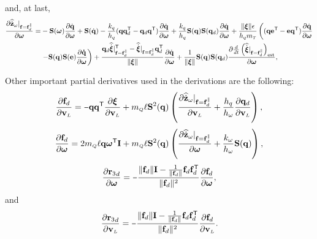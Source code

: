 \documentclass[journal,onecolumn]{IEEEtran}
\newcommand{\minus}{\scalebox{0.75}[1.0]{$-$}}
\begin{document}
	and, at last,
    \begin{align}
        \frac{\partial\zwdothat|_{\f=\fd^{\|}}}{\partial\wL}=&-\Skew{\wL}\frac{\partial\dirdot}{\partial\wL}+\Skew{\dirdot}-\frac{k_q}{h_q}(\dir\dird[T]-\dird\dir[T])\frac{\partial\dirdot}{\partial\wL}
        +\frac{k_q}{h_q}\Skew{\dir}\Skew{\dird}\frac{\partial\dirdot}{\partial\wL} + \frac{\|\Xiq\|\epsilon}{h_{q}\mT}\left((\dir{\bf e}\trs-{\bf e}\dir[T])\frac{\partial\dirdot}{\partial\wL}\right. \nonumber\\
        &\left.-\Skew{\dir}\Skew{\bf e}\frac{\partial\dirdot}{\partial\wL}\right)+\frac{\dird\widehat{\dot{\Xiq}}|_{\f=\fd^{\|}}\trs-\widehat{\dot{\Xiq}}|_{\f=\fd^{\|}}\dird[T]}{\|\Xiq\|}\frac{\partial\dirdot}{\partial\wL}
        +\frac{1}{\|\Xiq\|}\Skew{\dir}\Skew{\dird}\frac{\partial\frac{d}{dt}\LP\widehat{\dot{\Xiq}}|_{\f=\fd^{\|}}\RP_{\text{est}}}{\partial\wL},
    \end{align}
	
	Other important partial derivatives used in the derivations are the following:
	\begin{equation}
		\frac{\partial\fd}{\partial\vL} = \minus\dir\dir[T]\frac{\partial\Xiq}{\partial\vL} + \mQ\ellp\Skew[2]{\dir}\left(\frac{\partial\zwdothat|_{\f=\fd^{\|}}}{\partial\vL} + \frac{h_q}{h_{\omega}}\frac{\partial\dird}{\partial\vL}\right),
	\end{equation}
	\begin{equation}
		\frac{\partial\fd}{\partial\wL}=2\mQ\ellp\dir\wL[T]{\bf I}+\mQ\ellp\Skew[2]{\dir}
	\LP\frac{\partial\zwdothat|_{\f=\fd^{\|}}}{\partial\wL}+\frac{k_{\omega}}{h_{\omega}}\Skew{\dir}\RP,
	\end{equation}
	\begin{equation}
		\frac{\partial\rzd}{\partial\wL} = \minus\frac{\|\fd\|{\bf I} - \frac{1}{\|\fd\|}\fd\fd[T]}{\|\fd\|^2}\frac{\partial\fd}{\partial\wL},
	\end{equation}
	and
	\begin{equation}
		\frac{\partial\rzd}{\partial\vL} = \minus\frac{\|\fd\|{\bf I}-\frac{1}{\|\fd\|}\fd\fd[T]}{\|\fd\|^2}\frac{\partial\fd}{\partial\vL}.
	\end{equation}
	
\end{document}
